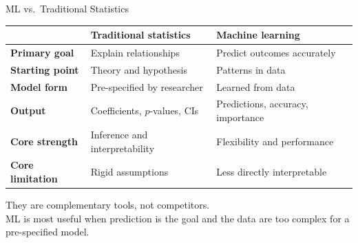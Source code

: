\documentclass[aspectratio=169, 10pt]{beamer}
\begin{document}
\begin{frame}{ML vs.\ Traditional Statistics}

\begin{center}
\small
\renewcommand{\arraystretch}{1.3}
\begin{tabular}{p{3.2cm} p{4.8cm} p{4.8cm}}
\toprule
 & \textbf{Traditional statistics} & \textbf{Machine learning} \\
\midrule
\textbf{Primary goal}     & Explain relationships          & Predict outcomes accurately \\
\textbf{Starting point}   & Theory and hypothesis          & Patterns in data \\
\textbf{Model form}       & Pre-specified by researcher    & Learned from data \\
\textbf{Output}           & Coefficients, $p$-values, CIs  & Predictions, accuracy, importance \\
\textbf{Core strength}    & Inference and interpretability & Flexibility and performance \\
\textbf{Core limitation}  & Rigid assumptions              & Less directly interpretable \\
\bottomrule
\end{tabular}
\end{center}

\vspace{0.8em}
\begin{center}
\alert{They are complementary tools, not competitors.}\\
\small ML is most useful when prediction is the goal and the data are too complex for a pre-specified model.
\end{center}

\end{frame}
\end{document}
